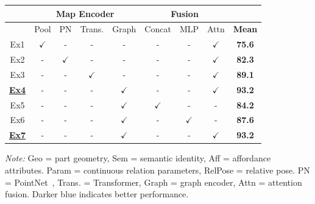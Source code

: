 \begin{table}[t]
\begin{minipage}[t]{0.46\textwidth}
{\begin{tabular}{c|cccc|ccc|c}
         & \multicolumn{4}{c|}{Map Encoder} & \multicolumn{3}{c|}{Fusion} &  \\
        \hline
         & Pool & PN & Trans. & Graph & Concat & MLP & Attn & \textbf{Mean} \\
        \hline
        Ex1 & $\checkmark$ & - & - & - & - & - & $\checkmark$ & \cellcolor{blue1}\textbf{75.6} \\
        Ex2 & - & $\checkmark$ & - & - & - & - & $\checkmark$ & \cellcolor{blue2}\textbf{82.3} \\
        Ex3 & - & - & $\checkmark$ & - & - & - & $\checkmark$ & \cellcolor{blue3}\textbf{89.1} \\
        \textbf{\underline{Ex4}} & - & - & - & $\checkmark$ & - & - & $\checkmark$ & \cellcolor{blue4}\textbf{93.2} \\
        \hline
        Ex5 & - & - & - & $\checkmark$ & $\checkmark$ & - & - & \cellcolor{blue2}\textbf{84.2} \\
        Ex6 & - & - & - & $\checkmark$ & - & $\checkmark$ & - & \cellcolor{blue3}\textbf{87.6} \\
        \textbf{\underline{Ex7}} & - & - & - & $\checkmark$ & - & - & $\checkmark$ & \cellcolor{blue4}\textbf{93.2} \\
        \hline
        \end{tabular}
    }
\end{minipage}

\par
\begin{minipage}{0.98\textwidth}
    \centering
    \scriptsize
    \textit{Note:}
    Geo = part geometry, Sem = semantic identity, Aff = affordance attributes.
    Param = continuous relation parameters, RelPose = relative pose.
    PN = PointNet~\cite{Qi2017PointNet}, Trans. = Transformer, Graph = graph encoder, Attn = attention fusion.
    Darker blue indicates better performance.
\end{minipage}
\end{table}
